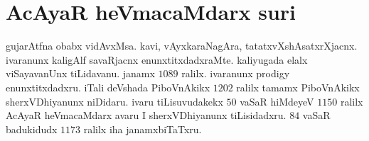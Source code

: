 \section*{\text AcAyaR heVmacaMdarx suri}
gujarAtfna obabx vidAvxMsa. kavi, vAyxkaraNagAra, tatatxvXshAsatxrXjacnx. ivaranunx kaligAlf savaRjacnx enunxtitxdadxraMte. kaliyugada elalx viSayavanUnx tiLidavanu. janamx $1089$ ralilx. ivaranunx {\rm prodigy} enunxtitxdadxru. iTali deVshada PiboVnAkikx $1202$ ralilx  tamamx PiboVnAkikx sherxVDhiyanunx niDidaru. ivaru tiLisuvudakekx $50$ vaSaR hiMdeyeV $1150$ ralilx AcAyaR heVmacaMdarx avaru I sherxVDhiyanunx tiLisidadxru. $84$ vaSaR badukidudx $1173$ ralilx iha janamxbiTaTxru.

